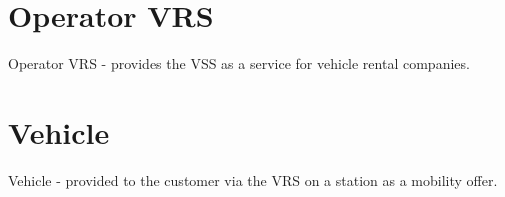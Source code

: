 \section*{Operator VRS}
Operator VRS - provides the VSS as a service for vehicle rental companies.

%
%
%
\section*{Vehicle}

Vehicle - provided to the customer via the VRS on a station as a mobility offer.

